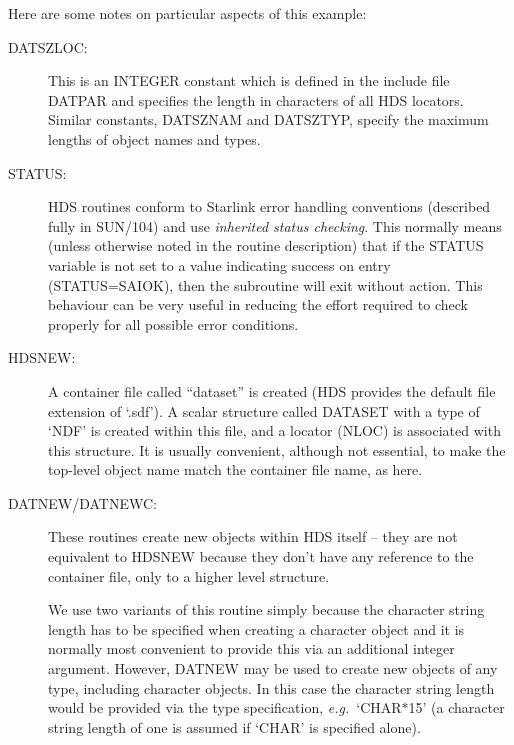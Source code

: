 \documentclass[twoside,11pt]{article}
\newcommand{\htmlref}[2]{#1}
\newcommand{\xref}[3]{#1}
\renewcommand{\_}{\texttt{\symbol{95}}}
\newcommand{\qt}[1]{``#1''}
\newcommand{\st}[1]{{\em{#1}}}
\newcommand{\astar}[0]{{$*$}}
\newcommand{\qt}[1]{{\tt{"}}#1{\tt{"}}}
\newcommand{\astar}[0]{*}
\begin{document}
Here are some notes on particular aspects of this example:

\begin{description}

\item [DAT\_\_SZLOC:]
This is an INTEGER constant which is defined in the include file
DAT\_PAR and specifies the length in characters of all HDS
\htmlref{locators}{sect:locators}. Similar constants, DAT\_\_SZNAM and DAT\_\_SZTYP, specify
the maximum lengths of object \htmlref{names}{sect:name} and
\htmlref{types}{sect:type}.

\item [STATUS:]
HDS \htmlref{routines}{appendix:alphalist} conform to Starlink error
handling conventions (described fully in \xref{SUN/104}{sun104}{}) and
use \st{inherited status checking}. This normally means (unless
otherwise noted in the routine description) that if the STATUS
variable is not set to a value indicating success on entry
(STATUS=SAI\_\_OK), then the subroutine will exit without action. This
behaviour can be very useful in reducing the effort required to check
properly for all possible error conditions.

\item [\htmlref{HDS\_NEW}{HDS_NEW}:]
A container file called \qt{dataset} is created (HDS provides the
default file extension of `.sdf'). A scalar structure called DATASET
with a type of `NDF' is created within this file, and a locator (NLOC)
is associated with this structure. It is usually convenient, although
not essential, to make the top-level object name match the container
file name, as here.

\item [\htmlref{DAT\_NEW}{DAT_NEW}/\htmlref{DAT\_NEWC}{DAT_NEWC}:]
These routines create new objects within HDS itself -- they are not
equivalent to \htmlref{HDS\_NEW}{HDS_NEW} because they don't have any
reference to the container file, only to a higher level structure.

We use two variants of this routine simply because the character
string length has to be specified when creating a character object and
it is normally most convenient to provide this via an additional
integer argument.  However, DAT\_NEW may be used to create new objects
of any type, including character objects. In this case the character
string length would be provided via the type specification, \st{e.g.}\
`\_CHAR{\astar}15' (a character string length of one is assumed if
`\_CHAR' is specified alone).


\end{description}
\end{document}
